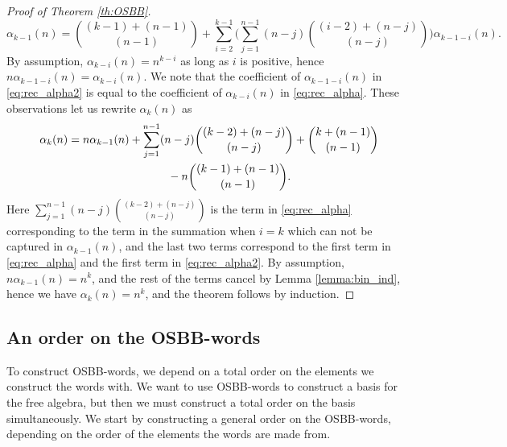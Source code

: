 \documentclass[10pt,a4paper]{amsart}
\numberwithin{equation}{section}
\begin{document}
\begin{proof}[Proof of Theorem \ref{th:OSBB}]
 \begin{equation}\label{eq:rec_alpha2}
 \alpha_{k-1}(n) = \binom{(k-1) + (n-1)}{(n-1)} + \sum_{i=2}^{k-1} \Biggl( \sum_{j=1}^{n-1} (n-j) \binom{(i-2) + (n-j)}{(n-j)} \Biggr) \alpha_{k-1-i}(n).
 \end{equation}
 By assumption, $\alpha_{k-i}(n) = n^{k-i}$ as long as $i$ is positive, hence $n\alpha_{k-1-i}(n) = \alpha_{k-i}(n)$. We note that the coefficient of $\alpha_{k-1-i}(n)$ in \eqref{eq:rec_alpha2} is equal to the coefficient of $\alpha_{k-i}(n)$ in \eqref{eq:rec_alpha}. These observations let us rewrite $\alpha_k(n)$ as
 \begin{gather*}
 \alpha_k(n) = n \alpha_{k-1}(n) + \sum_{j=1}^{n-1}(n-j)\binom{(k-2) + (n-j)}{(n-j)} + \binom{k + (n-1)}{(n-1)}\\ \hphantom{\alpha_k(n) =}{}
 - n\binom{(k-1)+(n-1)}{(n-1)}.
 \end{gather*}
 Here $\sum_{j=1}^{n-1}(n-j)\binom{(k-2) + (n-j)}{(n-j)}$ is the term in \eqref{eq:rec_alpha} corresponding to the term in the summation when $i=k$ which can not be captured in $\alpha_{k-1}(n)$, and the last two terms correspond to the first term in \eqref{eq:rec_alpha} and the first term in \eqref{eq:rec_alpha2}. By assumption, $n\alpha_{k-1}(n)=n^k$, and the rest of the terms cancel by Lemma \ref{lemma:bin_ind}, hence we have $\alpha_k(n)=n^k$, and the theorem follows by induction.
\end{proof}

\subsection{An order on the OSBB-words}

To construct OSBB-words, we depend on a total order on the elements we construct the words with. We want to use OSBB-words to construct a basis for the free algebra, but then we must construct a total order on the basis simultaneously. We start by constructing a general order on the OSBB-words, depending on the order of the elements the words are made from.
\end{document}
